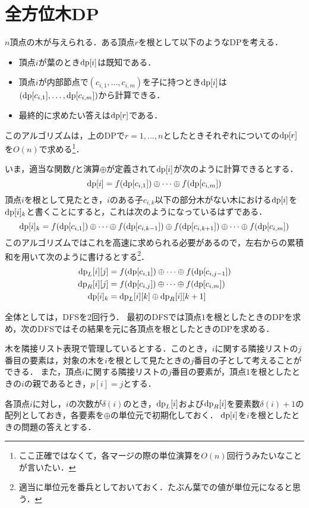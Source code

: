 \documentclass{jsarticle}
\newcommand{\DP}{\ensuremath\mathrm{dp}}
\begin{document}
\section{全方位木DP}
$n$頂点の木が与えられる．ある頂点$r$を根として以下のようなDPを考える．
\begin{itemize}
\item 頂点$i$が葉のとき$\DP[i]$は既知である．
\item 頂点$i$が内部節点で$(c_{i,1}, \dots, c_{i,m})$を子に持つとき$\DP[i]$は$(\DP[c_{i,1}], \dots, \DP[c_{i,m}])$から計算できる．
\item 最終的に求めたい答えは$\DP[r]$である．
\end{itemize}
このアルゴリズムは，上のDPで$r=1, \dots, n$としたときそれぞれについての$\DP[r]$を$O(n)$で求める\footnote{ここ正確ではなくて，各マージの際の単位演算を$O(n)$回行うみたいなことが言いたい．}．

いま，適当な関数$f$と演算$\oplus$が定義されて$\DP[i]$が次のように計算できるとする．
\[\DP[i] = f(\DP[c_{i,1}]) \oplus \dots \oplus f(\DP[c_{i,m}])\]
頂点$i$を根として見たとき，$i$のある子$c_{i,k}$以下の部分木がない木における$\DP[i]$を$\DP[i]_k$と書くことにすると，これは次のようになっているはずである．
\[\DP[i]_k = f(\DP[c_{i,1}]) \oplus \dots \oplus f(\DP[c_{i,k-1}]) \oplus f(\DP[c_{i,k+1}]) \oplus \dots \oplus f(\DP[c_{i,m}])\]
このアルゴリズムではこれを高速に求められる必要があるので，左右からの累積和を用いて次のように書けるとする\footnote{適当に単位元を番兵としておいておく．たぶん葉での値が単位元になると思う．}．
\begin{align*}
  \DP_L[i][j] &= f(\DP[c_{i,1}]) \oplus \dots \oplus f(\DP[c_{i,j-1}])\\
  \DP_R[i][j] &= f(\DP[c_{i,j}]) \oplus \dots \oplus f(\DP[c_{i,m}])\\
  \DP[i]_k &= \DP_L[i][k] \oplus \DP_R[i][k+1]
\end{align*}

全体としては，DFSを2回行う．
最初のDFSでは頂点$1$を根としたときのDPを求め，次のDFSではその結果を元に各頂点を根としたときのDPを求める．

木を隣接リスト表現で管理しているとする．このとき，$i$に関する隣接リストの$j$番目の要素は，対象の木を$i$を根として見たときの$j$番目の子として考えることができる．
また，頂点$i$に関する隣接リストの$j$番目の要素が，頂点$1$を根としたときの$i$の親であるとき，$p[i] = j$とする．

各頂点$i$に対し，$i$の次数が$\delta(i)$のとき，$\DP_L[i]$および$\DP_R[i]$を要素数$\delta(i)+1$の配列としておき，各要素を$\oplus$の単位元で初期化しておく．
$\DP[i]$を$i$を根としたときの問題の答えとする．
\end{document}
